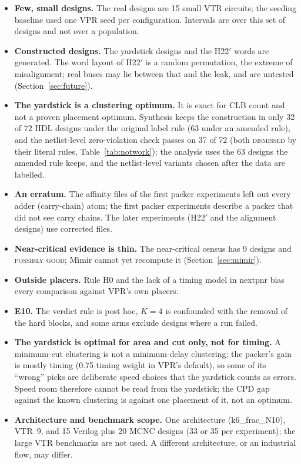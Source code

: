 \begin{itemize}
\item \textbf{Few, small designs.} The real designs are 15 small VTR circuits; the seeding baseline used one VPR seed per configuration. Intervals are over this set of designs and not over a population.
\item \textbf{Constructed designs.} The yardstick designs and the H22$'$ words are generated. The word layout of H22$'$ is a random permutation, the extreme of misalignment; real buses may lie between that and the leak, and are untested (Section~\ref{sec:future}).
\item \textbf{The yardstick is a clustering optimum.} It is exact for CLB count and not a proven placement optimum. Synthesis keeps the construction in only 32 of 72 HDL designs under the original label rule (63 under an amended rule), and the netlist-level zero-violation check passes on 37 of 72 (both \textsc{dismissed} by their literal rules, Table~\ref{tab:notwork}); the analysis uses the 63 designs the amended rule keeps, and the netlist-level variants chosen after the data are labelled.
\item \textbf{An erratum.} The affinity files of the first packer experiments left out every adder (carry-chain) atom; the first packer experiments describe a packer that did not see carry chains. The later experiments (H22$'$ and the alignment designs) use corrected files.
\item \textbf{Near-critical evidence is thin.} The near-critical census has 9 designs and \textsc{possibly good}; M\'{\i}mir cannot yet recompute it (Section~\ref{sec:mimir}).
\item \textbf{Outside placers.} Rule H0 and the lack of a timing model in nextpnr bias every comparison against VPR's own placers.
\item \textbf{E10.} The verdict rule is post hoc, $K=4$ is confounded with the removal of the hard blocks, and some arms exclude designs where a run failed.
\item \textbf{The yardstick is optimal for area and cut only, not for timing.} A minimum-cut clustering is not a minimum-delay clustering; the packer's gain is mostly timing (0.75 timing weight in VPR's default), so some of its ``wrong'' picks are deliberate speed choices that the yardstick counts as errors. Speed room therefore cannot be read from the yardstick; the CPD gap against the known clustering is against one placement of it, not an optimum.
\item \textbf{Architecture and benchmark scope.} One architecture (k6\_frac\_N10), VTR~9, and 15 Verilog plus 20 MCNC designs (33 or 35 per experiment); the large VTR benchmarks are not used. A different architecture, or an industrial flow, may differ.

\end{itemize}
